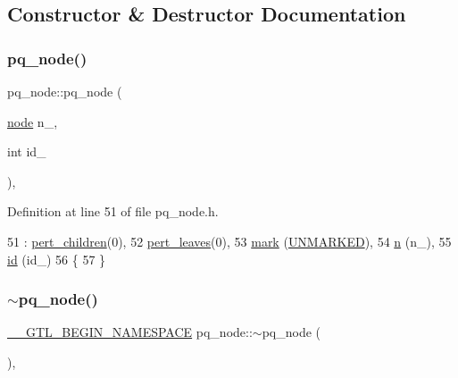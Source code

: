 \subsection{Constructor \& Destructor Documentation}
\mbox{\label{classpq__node_a75720c94fd6e2865ba24c76ff66b33b2}} 
\subsubsection{\texorpdfstring{pq\+\_\+node()}{pq\_node()}}
{\footnotesize\ttfamily pq\+\_\+node\+::pq\+\_\+node (\begin{DoxyParamCaption}\item[{\mbox{\hyperlink{classnode}{node}}}]{n\+\_\+,  }\item[{int}]{id\+\_\+ }\end{DoxyParamCaption})\hspace{0.3cm}{\ttfamily [inline]}, {\ttfamily [protected]}}



Definition at line 51 of file pq\+\_\+node.\+h.


\begin{DoxyCode}
51                                :  \mbox{\hyperlink{classpq__node_a8d8fb7b3059e7aeecf62eeed34076afb}{pert\_children}}(0),
52                   \mbox{\hyperlink{classpq__node_a3fb78609f93f41efd6826ed3169fc312}{pert\_leaves}}(0),
53                   \mbox{\hyperlink{classpq__node_aee913582a7b268ce2570bee8a8367c50}{mark}} (\mbox{\hyperlink{classpq__node_a6236b20cd5f6cc02cb5f637ed34c96d9a7fbe5f6a363f9f2b5a154c61b2389d59}{UNMARKED}}),
54                   \mbox{\hyperlink{classpq__node_a4997fd09a95d9a659b99cea04197740a}{n}} (n\_),
55                   \mbox{\hyperlink{classpq__node_ad0034c1f93c3c77edb6d3a03f25aba06}{id}} (id\_)
56     \{
57     \}
\end{DoxyCode}
\mbox{\label{classpq__node_ad23fe1826e949ceb746c37426bc1f8b4}} 
\subsubsection{\texorpdfstring{$\sim$pq\+\_\+node()}{~pq\_node()}}
{\footnotesize\ttfamily \mbox{\hyperlink{_g_t_l_8h_a2d9f24096ac60918452dd51f32b64aa9}{\+\_\+\+\_\+\+G\+T\+L\+\_\+\+B\+E\+G\+I\+N\+\_\+\+N\+A\+M\+E\+S\+P\+A\+CE}} pq\+\_\+node\+::$\sim$pq\+\_\+node (\begin{DoxyParamCaption}{ }\end{DoxyParamCaption})\hspace{0.3cm}{\ttfamily [protected]}, {\ttfamily [virtual]}}



